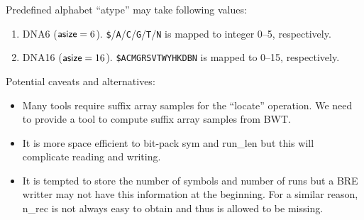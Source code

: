 \documentclass[10pt]{article}
\begin{document}
{\small
Predefined alphabet ``{\sf atype}'' may take following values:
\begin{enumerate}
\item {\sf DNA6} (${\sf asize}=6$). {\tt \$}/{\tt A}/{\tt C}/{\tt G}/{\tt T}/{\tt N} is mapped to integer 0--5, respectively.
\item {\sf DNA16} (${\sf asize}=16$). {\tt \$ACMGRSVTWYHKDBN} is mapped to 0--15, respectively.
\end{enumerate}

Potential caveats and alternatives:
\begin{itemize}
\item Many tools require suffix array samples for the ``locate'' operation.
  We need to provide a tool to compute suffix array samples from BWT.
\item It is more space efficient to bit-pack {\sf sym} and {\sf run\_len} but this will complicate reading and writing.
\item It is tempted to store the number of symbols and number of runs but a BRE writter may not have this information at the beginning.
  For a similar reason, {\sf n\_rec} is not always easy to obtain and thus is allowed to be missing.
\end{itemize}
}
\end{document}
